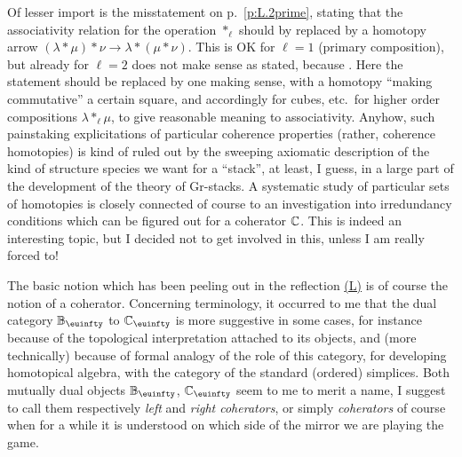 Of lesser import is the misstatement on p.~\ref{p:L.2prime},
stating that the associativity relation for the operation $*_\ell$
should by replaced by a homotopy arrow
$(\lambda * \mu) * \nu \to \lambda * (\mu * \nu)$. This is OK for
$\ell=1$ (primary composition), but already for $\ell=2$ does not make
sense as stated, because . Here the
statement should be replaced by one making sense, with a homotopy
``making commutative'' a certain square, and accordingly for cubes,
etc.\ for higher order compositions $\lambda *_\ell \mu$, to give
reasonable meaning to associativity. Anyhow, such painstaking
explicitations of particular coherence properties (rather, coherence
homotopies) is kind of ruled out by the sweeping axiomatic description
of the kind of structure species we want for a ``stack'', at least, I
guess, in a large part of the development of the theory of
Gr-stacks. A systematic study of particular sets of homotopies is
closely connected of course to an investigation into irredundancy
conditions which can be figured out for a coherator ${\mathbb{C}}$. This is
indeed an interesting topic, but I decided not to get involved in
this, unless I am really forced to!

The basic notion which has been peeling out in the reflection \hyperref[ch:I]{(L)} is
of course the notion of a coherator. Concerning terminology, it
occurred to me that the dual category $\bB_\oo$ to $\bC_\oo$ is
more suggestive in some cases, for instance because of the topological
interpretation attached to its objects, and (more technically) because
of formal analogy of the role of this category, for developing
homotopical algebra, with the category of the standard (ordered)
simplices. Both mutually dual objects $\bB_\oo$, $\bC_\oo$ seem
to me to merit a name, I suggest to call them respectively \emph{left}
and \emph{right coherators}, or simply \emph{coherators} of course
when for a while it is understood on which side of the mirror we are
playing the game.


